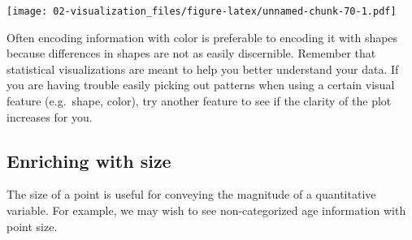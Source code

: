 \documentclass[
]{book}
\newenvironment{Shaded}{\begin{snugshade}}{\end{snugshade}}
\newcommand{\CommentTok}[1]{\textcolor[rgb]{0.56,0.35,0.01}{\textit{#1}}}
\newcommand{\DataTypeTok}[1]{\textcolor[rgb]{0.13,0.29,0.53}{#1}}
\newcommand{\FloatTok}[1]{\textcolor[rgb]{0.00,0.00,0.81}{#1}}
\newcommand{\KeywordTok}[1]{\textcolor[rgb]{0.13,0.29,0.53}{\textbf{#1}}}
\newcommand{\NormalTok}[1]{#1}
\newcommand{\OperatorTok}[1]{\textcolor[rgb]{0.81,0.36,0.00}{\textbf{#1}}}
\newcommand{\StringTok}[1]{\textcolor[rgb]{0.31,0.60,0.02}{#1}}
\begin{document}
\begin{Shaded}
\end{Shaded}

\texttt{[image: 02-visualization\_files/figure-latex/unnamed-chunk-70-1.pdf]}

Often encoding information with color is preferable to encoding it with shapes because differences in shapes are not as easily discernible. Remember that statistical visualizations are meant to help you better understand your data. If you are having trouble easily picking out patterns when using a certain visual feature (e.g.~shape, color), try another feature to see if the clarity of the plot increases for you.

\hypertarget{enriching-with-size}{%
\subsection{Enriching with size}\label{enriching-with-size}}

The size of a point is useful for conveying the magnitude of a quantitative variable. For example, we may wish to see non-categorized age information with point size.

\begin{Shaded}
\end{Shaded}
\end{document}
